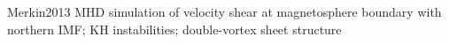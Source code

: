 Merkin2013 MHD simulation of velocity shear at magnetosphere boundary with northern IMF; KH instabilities; double-vortex sheet structure\\




